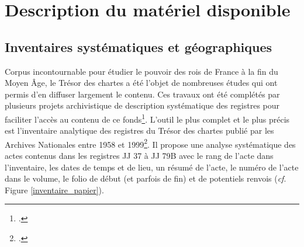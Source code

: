 \documentclass[a4paper,12pt,twoside]{book}
\begin{document}
	\section{Description du matériel disponible}
	
	\subsection{Inventaires systématiques et géographiques}
	
	Corpus incontournable pour étudier le pouvoir des rois de France à la fin du Moyen Âge, le Trésor des chartes a été l'objet de nombreuses études qui ont permis d'en diffuser largement le contenu. Ces travaux ont été complétés par plusieurs projets archivistique de description systématique des registres pour faciliter l'accès au contenu de ce fonds\footcite{stutzmann_recherche_2017}. L'outil le plus complet et le plus précis est l'inventaire analytique des registres du Trésor des chartes publié par les Archives Nationales entre 1958 et 1999\footcite{glenisson_registres_1958}. Il propose une analyse systématique des actes contenus dans les registres JJ 37 à JJ 79B avec le rang de l'acte dans l'inventaire, les dates de temps et de lieu, un résumé de l'acte, le numéro de l'acte dans le volume, le folio de début (et parfois de fin) et de potentiels renvois (\textit{cf}. Figure \ref{inventaire_papier}).
	
\end{document}
